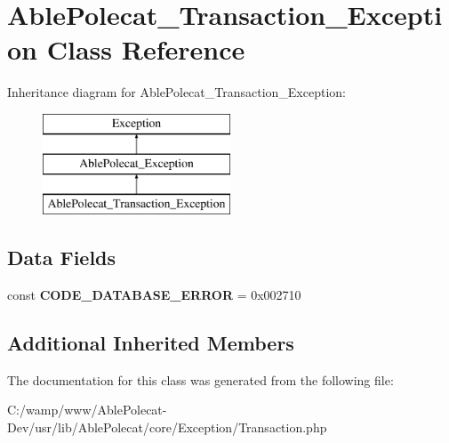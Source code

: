 \hypertarget{class_able_polecat___transaction___exception}{}\section{Able\+Polecat\+\_\+\+Transaction\+\_\+\+Exception Class Reference}
\label{class_able_polecat___transaction___exception}
Inheritance diagram for Able\+Polecat\+\_\+\+Transaction\+\_\+\+Exception\+:\begin{figure}[H]
\begin{center}
\leavevmode
\includegraphics[height=3.000000cm]{class_able_polecat___transaction___exception}
\end{center}
\end{figure}
\subsection*{Data Fields}
\begin{DoxyCompactItemize}
\item 
\hypertarget{class_able_polecat___transaction___exception_ac8d1bd1204eaae98fc4085db92bc52a5}{}const {\bfseries C\+O\+D\+E\+\_\+\+D\+A\+T\+A\+B\+A\+S\+E\+\_\+\+E\+R\+R\+O\+R} = 0x002710\label{class_able_polecat___transaction___exception_ac8d1bd1204eaae98fc4085db92bc52a5}

\end{DoxyCompactItemize}
\subsection*{Additional Inherited Members}


The documentation for this class was generated from the following file\+:\begin{DoxyCompactItemize}
\item 
C\+:/wamp/www/\+Able\+Polecat-\/\+Dev/usr/lib/\+Able\+Polecat/core/\+Exception/Transaction.\+php\end{DoxyCompactItemize}
